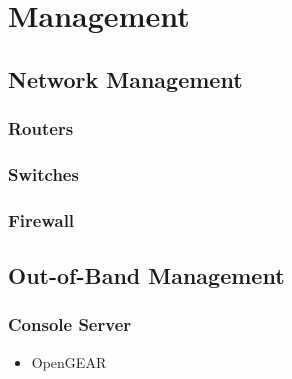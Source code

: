 \chapter[Mgmt]{Management}

\section[Network Mgmt]{Network Management}

\subsection{Routers}

\subsection{Switches}

\subsection{Firewall}

\section[OOB Mgmt]{Out-of-Band Management}

\subsection{Console Server}

\begin{itemize}
    \item OpenGEAR
\end{itemize}


